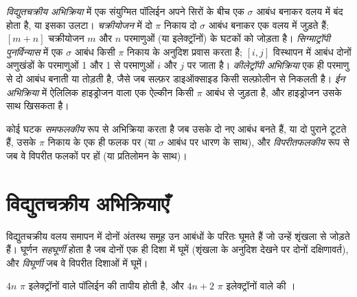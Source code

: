 \begin{definition}[परिचक्रीय अभिक्रियाओं के परिवार]\label{def:b3:pericyclic:families}
\emph{विद्युतचक्रीय अभिक्रिया} में एक संयुग्मित
पॉलिईन अपने सिरों के बीच एक $\sigma$ आबंध बनाकर वलय में बंद होता है, या
इसका उलटा। \emph{चक्रीयोजन} में दो $\pi$ निकाय
दो $\sigma$ आबंध बनाकर एक वलय में जुड़ते हैं; $[m + n]$ चक्रीयोजन
$m$ और $n$ परमाणुओं (या इलेक्ट्रॉनों) के घटकों को जोड़ता है। \emph{सिग्माट्रॉपी
पुनर्विन्यास} में एक $\sigma$ आबंध किसी $\pi$
निकाय के अनुदिश प्रवास करता है; $[i, j]$ विस्थापन में आबंध दोनों अणुखंडों के परमाणुओं 1 और 1 से परमाणुओं $i$ और $j$
पर जाता है। \emph{कीलेट्रॉपी अभिक्रिया}
एक ही परमाणु से दो आबंध बनाती या तोड़ती है, जैसे जब सल्फ़र डाइऑक्साइड
किसी सल्फ़ोलीन से निकलती है। \emph{ईन अभिक्रिया} में
ऐलिलिक हाइड्रोजन वाला एक ऐल्कीन किसी $\pi$ आबंध से जुड़ता है, और हाइड्रोजन उसके साथ खिसकता है।
\end{definition}

\begin{definition}\label{def:b3:pericyclic:faciality}
कोई घटक \emph{समफलकीय} रूप से अभिक्रिया करता है जब उसके दो नए
आबंध बनते हैं, या दो पुराने टूटते हैं, उसके $\pi$ निकाय के एक ही फलक पर (या
$\sigma$ आबंध पर धारण के साथ), और \emph{विपरीतफलकीय} रूप से जब वे
विपरीत फलकों पर हों (या प्रतिलोमन के साथ)।
\end{definition}

\section{विद्युतचक्रीय अभिक्रियाएँ}

\begin{definition}[सहघूर्णी और विघूर्णी]\label{def:b3:pericyclic:rotation-modes}
विद्युतचक्रीय वलय समापन में दोनों अंतस्थ समूह उन आबंधों के परितः घूमते हैं
जो उन्हें शृंखला से जोड़ते हैं। घूर्णन \emph{सहघूर्णी} होता है
जब दोनों एक ही दिशा में घूमें (शृंखला के अनुदिश देखने पर दोनों दक्षिणावर्त), और
\emph{विघूर्णी} जब वे विपरीत दिशाओं में घूमें।
\end{definition}

\begin{theorem}[विद्युतचक्रीय अभिक्रियाएँ]\label{thm:b3:pericyclic:electrocyclic}
$4n$ $\pi$ इलेक्ट्रॉनों वाले पॉलिईन की तापीय 
 होती है, और $4n + 2$ $\pi$ इलेक्ट्रॉनों वाले की ।
\end{theorem}

